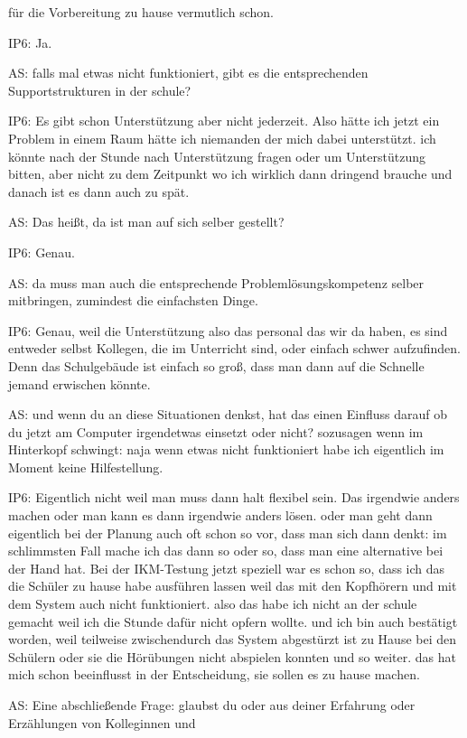 \documentclass[fontsize=11pt,paper=a4]{scrbook}
\begin{document}
{\begin{itemize*}
für die Vorbereitung zu hause vermutlich schon.
\item[IP6:] Ja.
\item[AS:] falls mal
etwas nicht funktioniert, gibt es die
entsprechenden Supportstrukturen in der
schule?
\item[IP6:] Es gibt schon Unterstützung
aber nicht jederzeit. Also hätte ich jetzt ein
Problem in einem 
Raum hätte ich niemanden der mich dabei unterstützt. 
ich könnte nach der Stunde nach Unterstützung fragen oder um Unterstützung
bitten,
aber nicht zu dem Zeitpunkt wo ich
wirklich dann dringend brauche und
danach ist es dann auch zu spät.
\item[AS:] Das heißt, da ist man auf sich selber gestellt?
\item[IP6:] Genau.
\item[AS:] da muss man auch die entsprechende
Problemlösungskompetenz selber mitbringen,  zumindest die einfachsten Dinge.
\item[IP6:] Genau, weil die Unterstützung also das
personal das wir da haben, es sind
entweder selbst Kollegen, die im Unterricht
sind, oder einfach schwer aufzufinden. Denn das Schulgebäude ist einfach so
groß, dass man dann auf die Schnelle jemand erwischen könnte.
\item[AS:] und wenn du an diese Situationen denkst,
hat das einen Einfluss darauf ob du jetzt
am Computer irgendetwas einsetzt oder nicht?
sozusagen wenn im Hinterkopf schwingt:
naja wenn etwas nicht funktioniert
habe ich eigentlich im Moment keine
Hilfestellung.
\item[IP6:] Eigentlich nicht weil
man muss dann halt flexibel sein. Das
irgendwie anders machen oder man kann es
dann irgendwie anders lösen.
oder man geht dann eigentlich bei der
Planung auch oft schon so vor, dass man
sich dann denkt: im schlimmsten Fall
mache ich das dann so oder so, dass man
eine alternative bei der Hand hat. Bei der IKM-Testung
jetzt speziell war es schon so, dass
ich das die Schüler zu hause habe
ausführen lassen weil das mit den
Kopfhörern und mit dem System auch nicht
funktioniert. also das habe ich nicht an
der schule gemacht weil ich die Stunde dafür nicht
opfern wollte. und ich bin auch
bestätigt worden, weil teilweise
zwischendurch das System abgestürzt ist zu Hause bei den Schülern oder sie die
Hörübungen nicht abspielen konnten und so weiter. das hat
mich schon beeinflusst in der 
Entscheidung, sie sollen es zu hause
machen.
\item[AS:] Eine abschließende Frage: glaubst du oder aus deiner Erfahrung oder Erzählungen von Kolleginnen und

\end{itemize*}}
\end{document}
